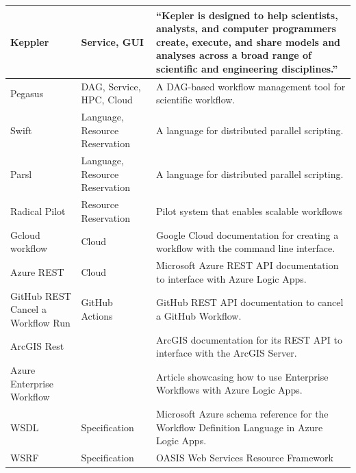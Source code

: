 \begin{table}[htb]
{{\begin{tabular}{|p{3cm}|p{3cm}|p{10cm}|}
Keppler  \cite{www-kepler} & Service, GUI & ``Kepler is designed to help scientists, analysts, and computer programmers create, execute, and share models and analyses across a broad range of scientific and engineering disciplines.'' \\
\hline

Pegasus  \cite{www-pegasus} & DAG, Service, HPC, Cloud &  A DAG-based workflow management tool for scientific workflow.  \\
\hline

Swift \cite{las-2007-swift} & Language, Resource Reservation & A language for distributed parallel scripting.\\
\hline

Parsl \cite{www-parsl} & Language, Resource Reservation & A language for distributed parallel scripting. \\
\hline

Radical Pilot \cite{arxiv-radical-pilot} & Resource Reservation & Pilot system that enables scalable workflows \\ 
\hline

Gcloud workflow \cite{www-gcloud} & Cloud & Google Cloud documentation for creating a workflow with the command line interface. \\
\hline

Azure REST \cite{www-azure-rest} & Cloud & Microsoft Azure REST API documentation to interface with Azure Logic Apps. \\
\hline

GitHub REST Cancel a Workflow Run \cite{www-github-rest-cancel}
& GitHub Actions
& GitHub REST API documentation to cancel a GitHub Workflow. \\
\hline

ArcGIS Rest \cite{www-arcgis-rest} & & ArcGIS documentation for its REST API to interface with the ArcGIS Server. \\
\hline

Azure Enterprise Workflow \cite{www-azure-enterprise-workflow} & & Article showcasing how to use Enterprise Workflows with Azure Logic Apps. \\
\hline

WSDL \cite{www-wsdl} & Specification & Microsoft Azure schema reference for the Workflow Definition Language in Azure Logic Apps. \\
  \hline

  WSRF \cite{www-wsrf} & Specification & OASIS Web Services Resource Framework\\


\end{tabular}}}
\end{table}
